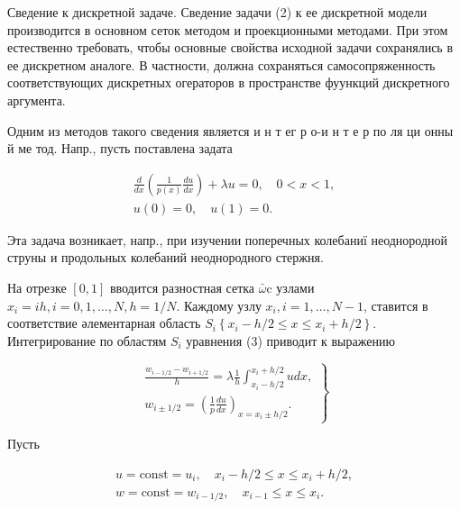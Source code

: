 \documentclass[10pt]{article}
\begin{document}
Сведение к дискретной задаче. Сведение задачи (2) к ее дискретной модели производится в основном сеток методом и проекционными методами. При этом естественно требовать, чтобы основные свойства исходной задачи сохранялись в ее дискретном аналоге. В частности, должна сохраняться самосопряженность соответствующих дискретных огераторов в пространстве фуункций дискретного аргумента.



Одним из методов такого сведения является и н т ег р о-и н т е р по ля ци онны й ме тод. Напр., пусть поставлена задата



\[

\begin{gathered}

\frac{d}{d x}\left(\frac{1}{p(x)} \frac{d u}{d x}\right)+\lambda u=0, \quad 0<x<1, \\

u(0)=0, \quad u(1)=0 .

\end{gathered}

\]



Эта задача возникает, напр., при изучении поперечных колебаниї неоднородной струны и продольных колебаний неоднородного стержня.



На отрезке $[0,1]$ вводится разностная сетка $\bar{\omega} \mathrm{c}$ узлами $x_{i}=i h, i=0,1, \ldots, N, h=1 / N$. Каждому узлу $x_{i}, i=1, \ldots, N-1$, ставится в соответствие әлементарная область $S_{i}\left\{x_{i}-h / 2 \leqslant x \leqslant x_{i}+h / 2\right\}$. Интегрирование по областям $S_{i}$ уравнения (3) приводит к выражению



\[

\left.\begin{array}{c}

\frac{w_{i-1 / 2}-w_{i+1 / 2}}{h}=\lambda \frac{1}{h} \int_{x_{i}-h / 2}^{x_{i}+h / 2} u d x, \\

w_{i \pm 1 / 2}=\left(\frac{1}{p} \frac{d u}{d x}\right)_{x=x_{i} \pm h / 2} .

\end{array}\right\}

\]



Пусть



\[

\begin{gathered}

u=\mathrm{const}=u_{i}, \quad x_{i}-h / 2 \leqslant x \leqslant x_{i}+h / 2, \\

w=\mathrm{const}=w_{i-1 / 2}, \quad x_{i-1} \leqslant x \leqslant x_{i} .

\end{gathered}

\]
\end{document}
